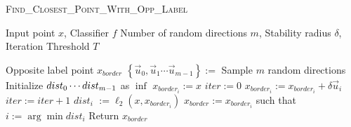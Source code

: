 \begin{algorithm}[tbh]
\begin{algorithmic}[1]
 \caption{\textsc{Find\_Closest\_Point\_With\_Opp\_Label}}
   \label{alg:findclosestpoint}
    
     Input point $x$, Classifier $f$
     Number of random directions $m$, Stability radius $\delta$, Iteration Threshold $T$

     Opposite label point $x_{border}$
    \STATE
    \STATE $\left\{\vec{u}_0, \vec{u}_1 \cdots \vec{u}_{m-1}\right\}:=$ Sample $m$ random directions
    \STATE Initialize $\textsc{$dist_0$} \cdots \textsc{$dist_{m-1}$}$ as $\inf$
    \STATE $x_{border_i} := x$
    \STATE $iter := 0$
    \STATE $x_{border_i} := x_{border_i}+ \delta \vec{u}_i$
    \STATE $iter := iter + 1$
    \ENDWHILE
    \STATE \textsc{$dist_i$} $:= \ell_2{(x, x_{border_i})}$
    \ENDIF
    \ENDFOR
    \STATE $x_{border}:= x_{border_i}$ \textrm{such that} $i:= \arg \min dist_i$
    \STATE Return $x_{border}$
\end{algorithmic}
\end{algorithm}



